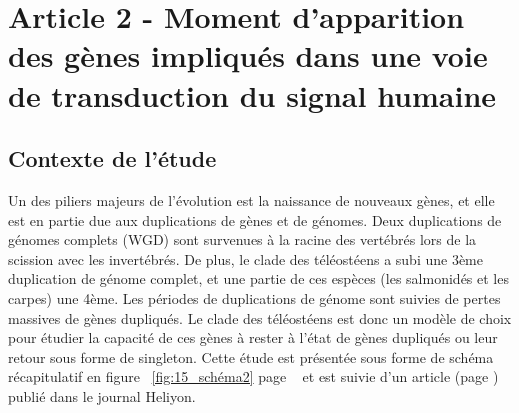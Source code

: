 \chapter{Article 2 - Moment d’apparition des gènes impliqués dans une voie de transduction du signal humaine}
\thispagestyle{firstpage}
\onehalfspacing

\section{Contexte de l'étude}
\par Un des piliers majeurs de l’évolution est la naissance de nouveaux gènes, et elle est en partie due aux duplications de gènes et de génomes. Deux duplications de génomes complets (WGD) sont survenues à la racine des vertébrés lors de la scission avec les invertébrés. De plus, le clade des téléostéens a subi une 3ème duplication de génome complet, et une partie de ces espèces (les salmonidés et les carpes) une 4ème. Les périodes de duplications de génome sont suivies de pertes massives de gènes dupliqués. Le clade des téléostéens est donc un modèle de choix pour étudier la capacité de ces gènes à rester à l’état de gènes dupliqués ou leur retour sous forme de singleton. Cette étude est présentée sous forme de schéma récapitulatif en figure ~\ref{fig:15_schéma2} page ~\pageref{fig:15_schéma2} et est suivie d’un article (page \pageref{art2}) publié dans le journal Heliyon.

